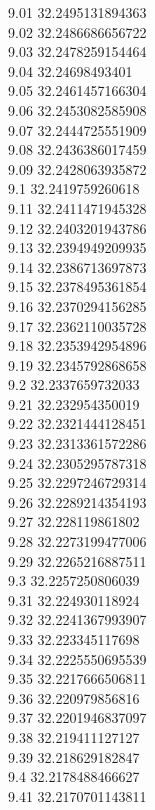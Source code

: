 {9.01	32.2495131894363\\
9.02	32.2486686656722\\
9.03	32.2478259154464\\
9.04	32.24698493401\\
9.05	32.2461457166304\\
9.06	32.2453082585908\\
9.07	32.2444725551909\\
9.08	32.2436386017459\\
9.09	32.2428063935872\\
9.1	32.2419759260618\\
9.11	32.2411471945328\\
9.12	32.2403201943786\\
9.13	32.2394949209935\\
9.14	32.2386713697873\\
9.15	32.2378495361854\\
9.16	32.2370294156285\\
9.17	32.2362110035728\\
9.18	32.2353942954896\\
9.19	32.2345792868658\\
9.2	32.2337659732033\\
9.21	32.232954350019\\
9.22	32.2321444128451\\
9.23	32.2313361572286\\
9.24	32.2305295787318\\
9.25	32.2297246729314\\
9.26	32.2289214354193\\
9.27	32.228119861802\\
9.28	32.2273199477006\\
9.29	32.2265216887511\\
9.3	32.2257250806039\\
9.31	32.224930118924\\
9.32	32.2241367993907\\
9.33	32.223345117698\\
9.34	32.2225550695539\\
9.35	32.2217666506811\\
9.36	32.220979856816\\
9.37	32.2201946837097\\
9.38	32.219411127127\\
9.39	32.218629182847\\
9.4	32.2178488466627\\
9.41	32.2170701143811\\
}
